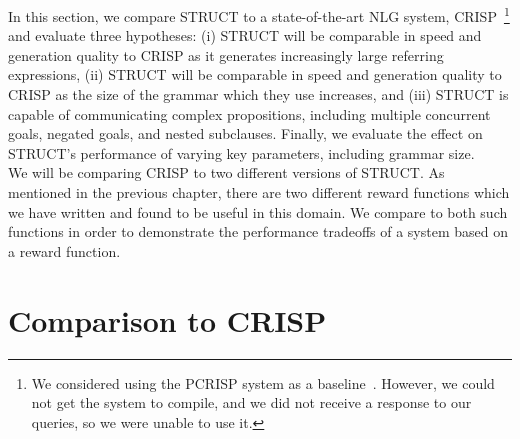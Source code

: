 In this section, we compare STRUCT to a state-of-the-art NLG system,
CRISP~\footnote{We considered using the PCRISP system as a
  baseline~\cite{bauer_sentence_2010}. However, we could not get the system to
  compile, and we did not receive a response to our queries, so we were
  unable to use it.}
and evaluate three hypotheses: (i) STRUCT will be
comparable in speed and generation quality to CRISP as it generates
increasingly large referring expressions, (ii) STRUCT will be
comparable in speed and generation quality to CRISP as the size of the
grammar which they use increases, and (iii) STRUCT is capable of
communicating complex propositions, including multiple concurrent
goals, negated goals, and nested subclauses.
Finally, we evaluate the effect on STRUCT's performance 
of varying key parameters, including grammar size.\\

We will be comparing CRISP to two different versions of STRUCT.
As mentioned in the previous chapter, there are two different reward
functions which we have written and found to be useful in this
domain.  We compare to both such functions in order to demonstrate
the performance tradeoffs of a system based on a reward function.

\section{Comparison to CRISP}

